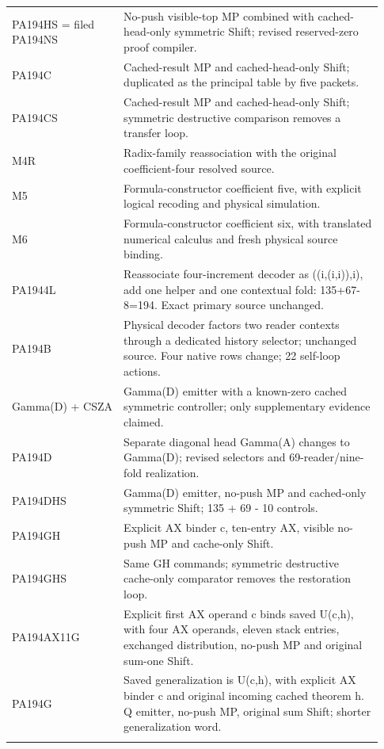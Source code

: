 \begin{longtable}{>{\raggedright\arraybackslash}p{0.28\linewidth}>{\raggedright\arraybackslash}p{0.65\linewidth}}
PA194HS = filed PA194NS & No-push visible-top MP combined with cached-head-only symmetric Shift; revised reserved-zero proof compiler.\\\addlinespace[4pt]
PA194C & Cached-result MP and cached-head-only Shift; duplicated as the principal table by five packets.\\\addlinespace[4pt]
PA194CS & Cached-result MP and cached-head-only Shift; symmetric destructive comparison removes a transfer loop.\\\addlinespace[4pt]
M4R & Radix-family reassociation with the original coefficient-four resolved source.\\\addlinespace[4pt]
M5 & Formula-constructor coefficient five, with explicit logical recoding and physical simulation.\\\addlinespace[4pt]
M6 & Formula-constructor coefficient six, with translated numerical calculus and fresh physical source binding.\\\addlinespace[4pt]
PA1944L & Reassociate four-increment decoder as ((i,(i,i)),i), add one helper and one contextual fold: 135+67-8=194. Exact primary source unchanged.\\\addlinespace[4pt]
PA194B & Physical decoder factors two reader contexts through a dedicated history selector; unchanged source. Four native rows change; 22 self-loop actions.\\\addlinespace[4pt]
Gamma(D) + CSZA & Gamma(D) emitter with a known-zero cached symmetric controller; only supplementary evidence claimed.\\\addlinespace[4pt]
PA194D & Separate diagonal head Gamma(A) changes to Gamma(D); revised selectors and 69-reader/\allowbreak{}nine-fold realization.\\\addlinespace[4pt]
PA194DHS & Gamma(D) emitter, no-push MP and cached-only symmetric Shift; 135 + 69 - 10 controls.\\\addlinespace[4pt]
PA194GH & Explicit AX binder c, ten-entry AX, visible no-push MP and cache-only Shift.\\\addlinespace[4pt]
PA194GHS & Same GH commands; symmetric destructive cache-only comparator removes the restoration loop.\\\addlinespace[4pt]
PA194AX11G & Explicit first AX operand c binds saved U(c,h), with four AX operands, eleven stack entries, exchanged distribution, no-push MP and original sum-one Shift.\\\addlinespace[4pt]
PA194G & Saved generalization is U(c,h), with explicit AX binder c and original incoming cached theorem h. Q emitter, no-push MP, original sum Shift; shorter generalization word.\\\addlinespace[4pt]

\end{longtable}
